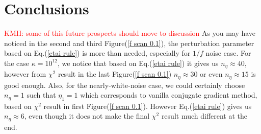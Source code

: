 \documentclass[twocolumn,linenumbers]{aastex631}
\newcommand{\kmh}[1]{\textcolor{red}{KMH: #1}}
\begin{document}
\section{Conclusions} \label{sec:conclusions} 
\kmh{some of this future prospects should move to discussion}
As you may have noticed in the second and third Figure(\ref{f scan 0.1}),
the perturbation parameter based on
Eq.(\ref{etai rule}) is more than needed, especially for $1/f$ noise case.
For the case $\kappa=10^{12}$, we notice that based on Eq.(\ref{etai rule})
it gives us $n_{\eta}\approx40$, however from $\chi^2$
result in the last Figure(\ref{f scan 0.1}) 
$n_{\eta}\approx30$ or even $n_{\eta} \approx 15$ is good enough.
Also, for the nearly-white-noise case, we could certainly choose $n_{\eta}=1$
such that $\eta_1=1$ which corresponds to vanilla conjugate gradient method,
based on $\chi^2$ result in first Figure(\ref{f scan 0.1}).
However Eq.(\ref{etai rule}) gives us $n_{\eta} \approx 6$,
even though it does not make the final $\chi^2$ result much different at the
end.
\end{document}
